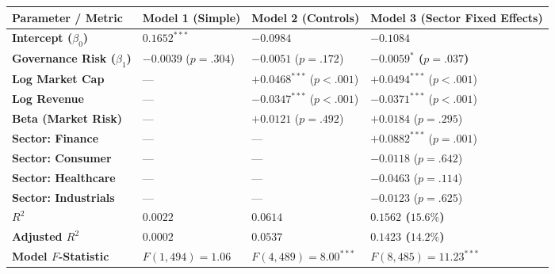 \documentclass[
]{article}
\newcounter{none} %
\begin{document}
{\def\LTcaptype{none} %
\begin{longtable}[]{@{}
  >{\raggedright\arraybackslash}p{}
  >{\centering\arraybackslash}p{}
  >{\centering\arraybackslash}p{}
  >{\centering\arraybackslash}p{}@{}}
\toprule\noalign{}
\begin{minipage}[b]{\linewidth}\raggedright
Parameter / Metric
\end{minipage} & \begin{minipage}[b]{\linewidth}\centering
Model 1 (Simple)
\end{minipage} & \begin{minipage}[b]{\linewidth}\centering
Model 2 (Controls)
\end{minipage} & \begin{minipage}[b]{\linewidth}\centering
Model 3 (Sector Fixed Effects)
\end{minipage} \\
\midrule\noalign{}
\endhead
\bottomrule\noalign{}
\endlastfoot
\textbf{Intercept (\(\beta_0\))} & \(0.1652^{***}\) & \(-0.0984\) &
\(-0.1084\) \\
\textbf{Governance Risk (\(\beta_1\))} & \(-0.0039\) (\(p = .304\)) &
\(-0.0051\) (\(p = .172\)) & \textbf{\(-0.0059^{*}\) (\(p = .037\))} \\
\textbf{Log Market Cap} & --- & \(+0.0468^{***}\) (\(p < .001\)) &
\(+0.0494^{***}\) (\(p < .001\)) \\
\textbf{Log Revenue} & --- & \(-0.0347^{***}\) (\(p < .001\)) &
\(-0.0371^{***}\) (\(p < .001\)) \\
\textbf{Beta (Market Risk)} & --- & \(+0.0121\) (\(p = .492\)) &
\(+0.0184\) (\(p = .295\)) \\
\textbf{Sector: Finance} & --- & --- & \(+0.0882^{***}\)
(\(p = .001\)) \\
\textbf{Sector: Consumer} & --- & --- & \(-0.0118\) (\(p = .642\)) \\
\textbf{Sector: Healthcare} & --- & --- & \(-0.0463\) (\(p = .114\)) \\
\textbf{Sector: Industrials} & --- & --- & \(-0.0123\) (\(p = .625\)) \\
\textbf{\(R^2\)} & \(0.0022\) & \(0.0614\) & \textbf{\(0.1562\)
(\(15.6\%\))} \\
\textbf{Adjusted \(R^2\)} & \(0.0002\) & \(0.0537\) & \textbf{\(0.1423\)
(\(14.2\%\))} \\
\textbf{Model \(F\)-Statistic} & \(F(1, 494) = 1.06\) &
\(F(4, 489) = 8.00^{***}\) & \textbf{\(F(8, 485) = 11.23^{***}\)} \\
\end{longtable}
}
\end{document}
